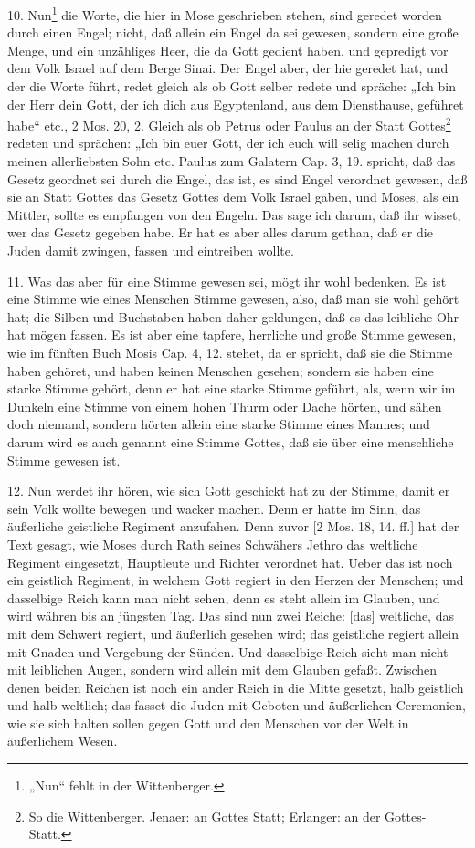 10. Nun\footnote{„Nun“ fehlt in der Wittenberger.} die Worte, die hier in Mose geschrieben stehen, sind geredet worden durch einen Engel; nicht, daß allein ein Engel da sei gewesen, sondern eine große Menge, und ein unzähliges Heer, die da Gott gedient haben, und gepredigt vor dem Volk Israel auf dem Berge Sinai. Der Engel aber, der hie geredet hat, und der die Worte führt, redet gleich als ob Gott selber redete und spräche: „Ich bin der Herr dein Gott, der ich dich aus Egyptenland, aus dem Diensthause, geführet habe“ etc., 2 Mos. 20, 2. Gleich als ob Petrus oder Paulus an der Statt Gottes\footnote{So die Wittenberger. Jenaer: an Gottes Statt; Erlanger: an der Gottes-Statt.} redeten und sprächen: „Ich bin euer Gott, der ich euch will selig machen durch meinen allerliebsten Sohn etc. Paulus zum Galatern Cap. 3, 19. spricht, daß das Gesetz geordnet sei durch die Engel, das ist, es sind Engel verordnet gewesen, daß sie an Statt Gottes das Gesetz Gottes dem Volk Israel gäben, und Moses, als ein Mittler, sollte es empfangen von den Engeln. Das sage ich darum, daß ihr wisset, wer das Gesetz gegeben habe. Er hat es aber alles darum gethan, daß er die Juden damit zwingen, fassen und eintreiben wollte.

11. Was das aber für eine Stimme gewesen sei, mögt ihr wohl bedenken. Es ist eine Stimme wie eines Menschen Stimme gewesen, also, daß man sie wohl gehört hat; die Silben und Buchstaben haben daher geklungen, daß es das leibliche Ohr hat mögen fassen. Es ist aber eine tapfere, herrliche und große Stimme gewesen, wie im fünften Buch Mosis Cap. 4, 12. stehet, da er spricht, daß sie die Stimme haben gehöret, und haben keinen Menschen gesehen; sondern sie haben eine starke Stimme gehört, denn er hat eine starke Stimme geführt, als, wenn wir im Dunkeln eine Stimme von einem hohen Thurm oder Dache hörten, und sähen doch niemand, sondern hörten allein eine starke Stimme eines Mannes; und darum wird es auch genannt eine Stimme Gottes, daß sie über eine menschliche Stimme gewesen ist.

12. Nun werdet ihr hören, wie sich Gott geschickt hat zu der Stimme, damit er sein Volk wollte bewegen und wacker machen. Denn er hatte im Sinn, das äußerliche geistliche Regiment anzufahen. Denn zuvor [2 Mos. 18, 14. ff.] hat der Text gesagt, wie Moses durch Rath seines Schwähers Jethro das weltliche Regiment eingesetzt, Hauptleute und Richter verordnet hat. Ueber das ist noch ein geistlich Regiment, in welchem Gott regiert in den Herzen der Menschen; und dasselbige Reich kann man nicht sehen, denn es steht allein im Glauben, und wird währen bis an jüngsten Tag. Das sind nun zwei Reiche: [das] weltliche, das mit dem Schwert regiert, und äußerlich gesehen wird; das geistliche regiert allein mit Gnaden und Vergebung der Sünden. Und dasselbige Reich sieht man nicht mit leiblichen Augen, sondern wird allein mit dem Glauben gefaßt. Zwischen denen beiden Reichen ist noch ein ander Reich in die Mitte gesetzt, halb geistlich und halb weltlich; das fasset die Juden mit Geboten und äußerlichen Ceremonien, wie sie sich halten sollen gegen Gott und den Menschen vor der Welt in äußerlichem Wesen.

